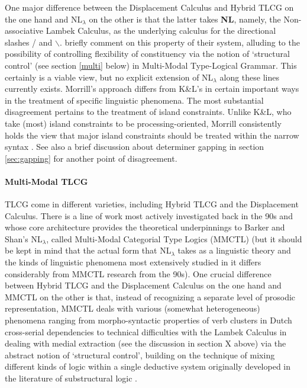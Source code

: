 \documentclass[output=paper]{langsci/langscibook}
\begin{document}
One major difference between the Displacement Calculus and Hybrid TLCG
on the one hand and NL\ensuremath{_\lambda} on the other is that the latter takes \textbf{NL},
namely, the Non-associative Lambek Calculus, as the underlying
calculus for the directional slashes / and \ensuremath{\backslash}. \citet{barkershan2015}
briefly comment on this property of their system, alluding to the
possibility of controlling flexibility of constituency via the notion
of `structural control' (see section \ref{multi} below) in Multi-Modal
Type-Logical Grammar. This certainly is a viable view, but no explicit
extension of NL\ensuremath{_\lambda} along these lines currently exists.
Morrill's approach differs from K\&L's in certain important ways in the
treatment of specific linguistic phenomena. The most substantial
disagreement pertains to the treatment of island constraints. Unlike
K\&L, who take (most) island constraints to be processing-oriented,
Morrill consistently holds the view that major island constraints
should be treated within the narrow syntax
\citep{Morrill94a-u,morrill2011,morrilllp}. See also a brief
discussion about determiner gapping in section \ref{sec:gapping}
for another point of disagreement.




\paragraph{Multi-Modal TLCG \label{multi}}

TLCG come in different varieties, including Hybrid TLCG and the Displacement
Calculus. There is a line of work most actively investigated back in
the 90s and whose core architecture provides the theoretical
underpinnings to Barker and Shan's NL\ensuremath{_\lambda}, called Multi-Modal Categorial
Type Logics (MMCTL)
\citep{moortgatoehrle94,Moortgat2011a-u,bernardiphd,vermaat05} (but it
should be kept in mind that the actual form that NL\ensuremath{_\lambda} takes as a
linguistic theory and the kinds of linguistic phenomena most
extensively studied in it differs considerably from MMCTL research
from the 90s). One crucial difference between Hybrid TLCG and the Displacement
Calculus on the one hand and MMCTL on the other is that, instead of
recognizing a separate level of prosodic representation, MMCTL deals
with various (somewhat heterogeneous) phenomena ranging from
morpho-syntactic properties of verb clusters in Dutch cross-serial
dependencies \citep{moortgatoehrle94}  to technical difficulties
with the Lambek Calculus in dealing with medial extraction
\citep{Moortgat2011a-u}  (see the discussion in section X above)
via the abstract notion of `structural control', building on the
technique of mixing different kinds of logic within  a single
deductive system originally developed in the literature of
substructural logic \citep{restall2000}. 
\end{document}
